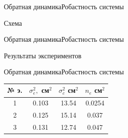 

\begin{frame}{Обратная динамика}{Робастность системы}
    \begin{block}{Схема}
    \end{block}
\end{frame}

\begin{frame}{Обратная динамика}{Робастность системы}
    \begin{block}{Результаты экспериментов}
    \end{block}
\end{frame}

\begin{frame}{Обратная динамика}{Робастность системы}

\begin{table}[H]
    \begin{tabular}{|c|c|c|c|}
        \hline 
        № э.& $\sigma^2_e,$ см$^2$ & $\sigma^2_c$ см$^2$ & $n_e$ см$^2$ \\ \hline 
        1& 0.103 & 13.54 & 0.0254\\ \hline
        2& 0.125 & 15.14  & 0.037 \\ \hline
        3& 0.131 & 12.74 & 0.047\\ \hline

    \end{tabular}
\end{table}
\end{frame}
 
